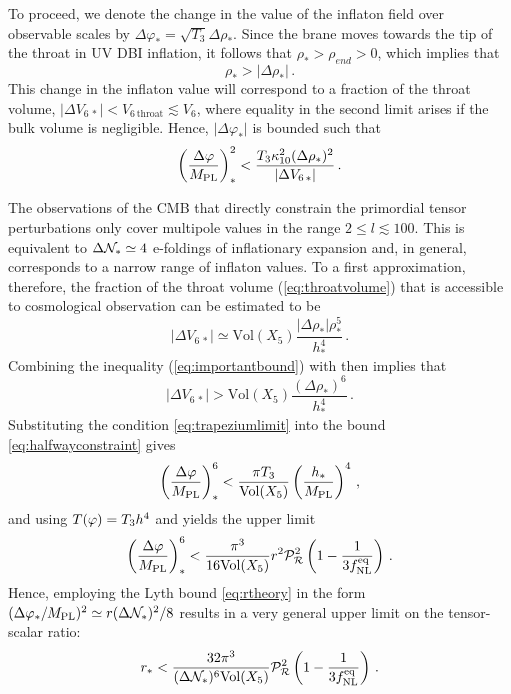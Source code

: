 To proceed, we denote the change in the value of the inflaton field over 
observable scales by 
$\Delta  \varphi _{*} = \sqrt{T_3} \Delta \rho_{*}$. 
Since the brane moves towards the tip of the throat in 
UV DBI inflation, it follows that $\rho_{*} > \rho_{end} >0$, which 
implies that  
% 
\begin{equation}
\label{eq:importantbound}
\rho_{*} > |\Delta \rho _{*}| \,.
\end{equation}
% 
This change in the inflaton value will correspond 
to a fraction of the throat volume, 
$| \Delta V _{6\,*}|  < {V_{6\,\mathrm{throat}}} \lesssim {V_6} $,
where equality in the second limit arises if
the bulk volume is negligible. Hence, 
$| \Delta \varphi_* |$ is bounded such that  
% 
\begin{equation}
\label{eq:halfwayconstraint}
\left( \frac{\Delta \varphi}{M_{\mathrm{PL}}} \right)^2_{*} < 
\frac{T_3 \kappa_{10}^2 (\Delta \rho_{*})^2}{|\Delta V_{6\,*}|} \,.
\end{equation}
%  


The observations of the CMB 
that directly constrain the primordial tensor perturbations only 
cover multipole values in the range $2 \le l \lesssim 100$. 
This is equivalent to ${\Delta \mathcal{N}_{*}} \simeq {4}$ 
e-foldings of inflationary expansion and, in general,   
corresponds to a narrow range of inflaton values. 
To a first approximation, therefore, the fraction of the throat volume 
(\ref{eq:throatvolume}) that is accessible to cosmological 
observation can be estimated to be 
% 
\begin{equation}
\label{eq:trapezium}
| \Delta V_{6\,*} | \simeq \mathrm{Vol}(X_5) 
\frac{|\Delta \rho_*| \rho^5_{*}}{h^{4}_{*}} \,.
\end{equation}
% 
Combining the inequality (\ref{eq:importantbound}) with  
then implies that 
% 
\begin{equation}
\label{eq:trapeziumlimit}
|\Delta V _{6\,*}| > \mathrm{Vol}(X_5) 
\frac{(\Delta \rho_* )^6}{h^{4}_*}  \,.
\end{equation}
% 
Substituting the condition \eqref{eq:trapeziumlimit} into the bound
\eqref{eq:halfwayconstraint} gives
\begin{equation}
\label{eq:hbound6}
\left( \frac{\Delta \varphi}{M_{\mathrm{PL}}} \right)_*^6 < \frac{\pi T_3}{\mathrm{Vol} (X_5)} 
\left( \frac{h_*}{M_{\mathrm{PL}}} \right)^4 \,,
\end{equation}   
and using $T(\varphi) = T_3 h^4$ and 
 yields the upper limit
% 
\begin{equation}
\label{eq:boundpower6}
\left( \frac{\Delta \varphi}{M_{\mathrm{PL}}} \right)^6_{*} 
< \frac{\pi^3}{16\mathrm{Vol}(X_5)} r^2 \mathcal{P}_{\mathcal{R}}^2  
\left( 1- \frac{1}{3f_{\mathrm{NL}}^{\mathrm{eq}}} \right)  \,.
\end{equation}
% 
Hence, employing the Lyth bound \eqref{eq:rtheory} in the form
$(\Delta \varphi_* / M_{\mathrm{PL}} )^2 \simeq 
r (\Delta \mathcal{N}_*)^2 /8$  
results in a very general upper limit on the tensor-scalar ratio: 
% 
\begin{equation}
\label{eq:generalbound}
r_{*} < \frac{32 \pi^3}{(\Delta \mathcal{N}_*)^6 \mathrm{Vol}(X_5)} 
\mathcal{P}_{\mathcal{R}}^2  \left( 1- \frac{1}{3f_{\mathrm{NL}}^{\mathrm{eq}}} \right) \,.
\end{equation}
% 


